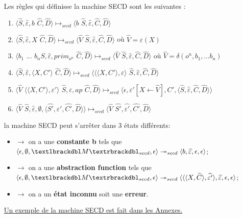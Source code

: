 \documentclass[10pt,a4paper]{article}
\begin{document}
			
			Les règles qui définisse la machine SECD sont les suivantes :
			\begin{enumerate}
				\item $\langle\widehat{S},\widehat{\varepsilon},b$ $\widehat{C},\widehat{D}\rangle \longmapsto_{secd} \langle b$ $\widehat{S},\widehat{\varepsilon},\widehat{C},\widehat{D}\rangle$
				\item $\langle\widehat{S},\widehat{\varepsilon},X$ $\widehat{C},\widehat{D}\rangle \longmapsto_{secd} \langle \widehat{V}$ $\widehat{S},\widehat{\varepsilon},\widehat{C},\widehat{D}\rangle$ où $\widehat{V} = \varepsilon(X)$
				\item $\langle b_{1}$ $...$ $b_{n}\widehat{S},\widehat{\varepsilon},prim_{o^{n}}$ $\widehat{C},\widehat{D}\rangle \longmapsto_{secd} \langle \widehat{V}$ $\widehat{S},\widehat{\varepsilon},\widehat{C},\widehat{D}\rangle$ où $\widehat{V} = \delta(o^{n},b_1,...b_{n})$
				\item $\langle\widehat{S},\widehat{\varepsilon},\langle X,C'\rangle$ $\widehat{C},\widehat{D}\rangle \longmapsto_{secd} \langle\langle\langle X,C'\rangle,\varepsilon\rangle$ $\widehat{S},\widehat{\varepsilon},\widehat{C},\widehat{D}\rangle$
				\item $\langle\widehat{V}$ $\langle\langle X,C'\rangle,\varepsilon'\rangle$ $\widehat{S},\widehat{\varepsilon},ap$ $\widehat{C},\widehat{D}\rangle \longmapsto_{secd} \langle\epsilon,\varepsilon'[X \leftarrow \widehat{V}],C',\langle\widehat{S},\widehat{\varepsilon},\widehat{C},\widehat{D}\rangle\rangle$
				\item $\langle\widehat{V}$ $\widehat{S},\widehat{\varepsilon},\emptyset,\langle\widehat{S'},\widehat{\varepsilon'},\widehat{C'},\widehat{D}\rangle\rangle \longmapsto_{secd} \langle \widehat{V}$ $\widehat{S'},\widehat{\varepsilon'},\widehat{C'},\widehat{D}\rangle$
			\end{enumerate}
			\bigbreak
			
			
			la machine SECD peut s'arrêter dans 3 états différents:
			\begin{itemize}
				\item[]$\longrightarrow$ on a une \textbf{constante b} tels que $\langle \epsilon,\emptyset,\textlbrackdbl M\textrbrackdbl_{secd},\epsilon\rangle \twoheadrightarrow_{secd} \langle b,\widehat{\varepsilon},\epsilon,\epsilon\rangle$;
				\item[]$\longrightarrow$ on a une \textbf{abstraction function} tels que $\langle \epsilon,\emptyset,\textlbrackdbl M\textrbrackdbl_{secd},\epsilon\rangle \twoheadrightarrow_{secd} \langle\langle\langle X,\widehat{C}\rangle,\widehat{\varepsilon'}\rangle,\widehat{\varepsilon},\epsilon,\epsilon\rangle$;
				\item[]$\longrightarrow$ on a un \textbf{état inconnu} soit une \textbf{erreur}.
			\end{itemize}
			\hyperref[SECD]{Un exemple de la machine SECD est fait dans les Annexes.}
			\bigbreak
			
\end{document}
